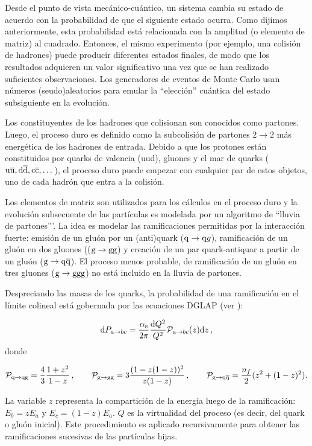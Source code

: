 \documentclass[a4paper,12pt]{article}
\begin{document}
Desde el punto de vista mecánico-cuántico, un sistema cambia su estado de acuerdo con la probabilidad de que el siguiente estado ocurra. Como dijimos anteriormente, esta probabilidad está relacionada con la amplitud (o elemento de matriz) al cuadrado. Entonces, el mismo experimento (por ejemplo, una colisión de hadrones) puede producir diferentes estados finales, de modo que los resultados adquieren un valor significativo una vez que se han realizado suficientes observaciones. Los generadores de eventos de Monte Carlo usan números (seudo)aleatorios para emular la ``elección'' cuántica del estado subsiguiente en la evolución.

Los constituyentes de los hadrones que colisionan son conocidos como partones. Luego, el proceso duro es definido como la subcolisión de partones $2\to 2$ más energética de los hadrones de entrada. Debido a que los protones están constituidos por quarks de valencia (uud), gluones y el mar de quarks (${\mathrm u}\overline{\mathrm u}, {\mathrm d}\overline{\mathrm d}, {\mathrm c}\overline{\mathrm c},\dots$), el proceso duro puede empezar con cualquier par de estos objetos, uno de cada hadrón que entra a la colisión.

Los elementos de matriz son utilizados para los cálculos en el proceso duro y la evolución subsecuente de las partículas es modelada por un algoritmo de ``lluvia de partones'''. La idea es modelar las ramificaciones permitidas por la interacción fuerte: emisión de un gluón por un (anti)quark (${\mathrm q}\to{\mathrm q} g$), ramificación de un gluón en dos gluones ((${\mathrm g}\to{\mathrm g}{\mathrm g}$) y creación de un par quark-antiquar a partir de un gluón (${\mathrm g}\to{\mathrm q}\overline{\mathrm q}$). El proceso menos probable, de ramificación de un gluón en tres gluones (${\mathrm g}\to{\mathrm g}{\mathrm g}{\mathrm g}$) no está incluido en la lluvia de partones.

Despreciando las masas de los quarks, la probabilidad de una ramificación en el límite
colineal está gobernada por las ecuaciones DGLAP (ver \cite{Sjostrand:2009ad}):

\begin{equation}
  {\mathrm d} P_{a\to bc} = \frac{\alpha_{\mathrm{s}}}{2\pi}\frac{{\mathrm d} Q^2}{Q^2}\mathcal{P}_{a\rightarrow bc}(z) {\mathrm d} z\label{eq:DGLAP}
  \, ,
\end{equation}
donde

$$
\mathcal{P}_{{\mathrm q}\to {\mathrm q}{\mathrm g}} = \frac43 \frac{1+z^2}{1-z}
  \, , \hspace{2em}
\mathcal{P}_{{\mathrm g}\to {\mathrm g}{\mathrm g}} = 3 \frac{(1-z(1-z))^2}{z(1-z)}
  \, , \hspace{2em}
\mathcal{P}_{{\mathrm g}\to {\mathrm q}\overline{\mathrm q}} = \frac{n_f}2 (z^2+(1-z)^2).
$$

La variable $z$ representa la compartición de la energía luego de la ramificación: $E_b=zE_a$ y $E_c=(1-z)E_a$. $Q$ es la virtualidad del proceso (es decir, del quark o gluón inicial). Este procedimiento es aplicado recursivamente para obtener las ramificaciones sucesivas de las partículas hijas.
\end{document}
